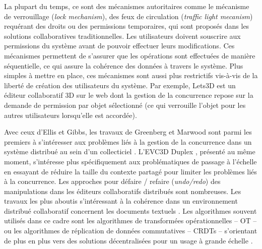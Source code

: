 La plupart du temps, ce sont des mécanismes autoritaires comme le mécanisme 
de verrouillage (\textit{lock mechanism}), des feux de circulation (\textit{traffic 
light mecanism}) requérant des droits ou des permissions temporaires, qui sont 
proposés dans les solutions collaboratives traditionnelles. Les utilisateurs doivent 
souscrire aux permissions du système avant de pouvoir effectuer leurs 
modifications. Ces mécanismes permettent de s'assurer que les opérations sont 
effectuées de manière séquentielle, ce qui assure la cohérence des données à 
travers le système. Plus simples à mettre en place, ces mécanismes sont aussi plus 
restrictifs vis-à-vis de la liberté de création des utilisateurs du système. Par 
exemple, Lets3D \cite{Ha2015} est un éditeur collaboratif \gls{3D} sur le web dont 
la 
gestion de la concurrence repose sur la demande de permission par objet 
sélectionné (ce qui verrouille l'objet pour les autres utilisateurs lorsqu'elle est 
accordée).

 Avec ceux d'Ellis et Gibbs, les travaux de Greenberg et Marwood sont parmi les 
premiers à s'intéresser aux problèmes liés à la gestion de la concurrence dans 
un système distribué au sein d'un collecticiel \cite{Ellis1989,Greenberg1994}. 
L'\gls{EVC3D} Duplex \cite{Pacull1994}, présenté au même 
moment, s'intéresse plus spécifiquement aux problématiques de 
passage à l'échelle en essayant de réduire la taille du contexte partagé pour 
limiter les problèmes liés à la concurrence. 
Les approches pour défaire / refaire (\textit{undo/redo}) des manipulations dans 
les éditeurs collaboratifs distribués sont nombreuses. Les travaux les plus 
aboutis s'intéressant à la cohérence dans un environnement distribué collaboratif concernent les documents 
textuels \cite{Prakash1994,Ressel1996,Sun2002}. 
Les algorithmes souvent utilisés dans ce cadre sont les algorithmes 
de  transformées opérationnelles -- \gls{OT} -- \cite{Ellis1989} ou les algorithmes 
de réplication de  données commutatives -- \glspl{CRDT} -- \cite{Shapiro2007} 
s'orientant de plus en plus vers des solutions décentralisées pour un usage à 
grande échelle \cite{Weiss2009a}. 


